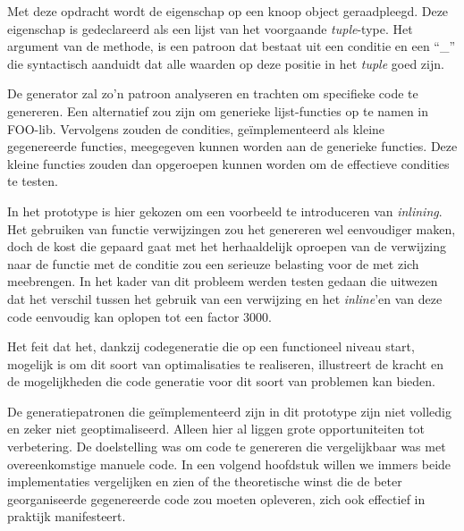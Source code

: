 Met deze opdracht wordt de eigenschap  op een knoop object
geraadpleegd. Deze eigenschap is gedeclareerd als een lijst van het voorgaande
\emph{tuple}-type. Het argument van de  methode, is een patroon dat
bestaat uit een conditie  en een ``\_'' die
syntactisch aanduidt dat alle waarden op deze positie in het \emph{tuple} goed
zijn.

De generator zal zo'n patroon analyseren en trachten om specifieke code te
genereren. Een alternatief zou zijn om generieke lijst-functies op te namen in
FOO-lib. Vervolgens zouden de condities, ge\"implementeerd als kleine
gegenereerde functies, meegegeven kunnen worden aan de generieke functies. Deze
kleine functies zouden dan opgeroepen kunnen worden om de effectieve condities
te testen.

In het prototype is hier gekozen om een voorbeeld te introduceren van
\emph{inlining}. Het gebruiken van functie verwijzingen zou het genereren wel
eenvoudiger maken, doch de kost die gepaard gaat met het herhaaldelijk oproepen
van de verwijzing naar de functie met de conditie zou een serieuze belasting
voor de \mcu met zich meebrengen. In het kader van dit probleem werden testen
gedaan die uitwezen dat het verschil tussen het gebruik van een verwijzing en
het \emph{inline}'en van deze code eenvoudig kan oplopen tot een factor 3000.

\vspace{5mm}

Het feit dat het, dankzij codegeneratie die op een functioneel niveau start,
mogelijk is om dit soort van optimalisaties te realiseren, illustreert de
kracht en de mogelijkheden die code generatie voor dit soort van problemen kan
bieden.

De generatiepatronen die ge\"implementeerd zijn in dit prototype zijn niet
volledig en zeker niet geoptimaliseerd. Alleen hier al liggen grote
opportuniteiten tot verbetering. De doelstelling was om code te genereren die
vergelijkbaar was met overeenkomstige manuele code. In een volgend hoofdstuk
willen we immers beide implementaties vergelijken en zien of the theoretische
winst die de beter georganiseerde gegenereerde code zou moeten opleveren, zich
ook effectief in praktijk manifesteert.
